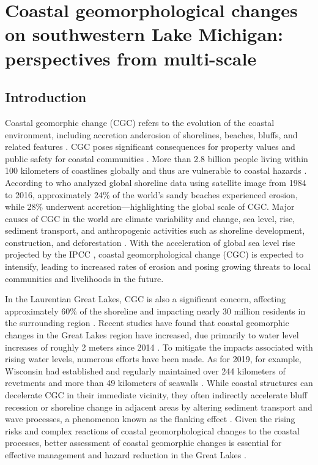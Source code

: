 \chapter{Coastal geomorphological changes on southwestern Lake Michigan: perspectives from multi-scale} 
\label{Chapter2}
\section{Introduction} 
\label{Introduction} 
Coastal geomorphic change (CGC) refers to the evolution of the coastal
environment, including accretion anderosion of shorelines, beaches, bluffs, and
related features \citep{vitousek2024scalable}. CGC poses significant consequences for
property values and public safety for coastal communities \citep{allen2019linking}.
More than 2.8 billion people living within 100 kilometers of coastlines globally
and thus are vulnerable to coastal hazards \citep{martinez2007coasts,
cosby_accelerating_2024}.  According to \citet{luijendijk_state_2018} who
analyzed global shoreline data using satellite image from 1984 to 2016,
approximately 24\% of the world’s sandy beaches experienced erosion, while 28\%
underwent accretion—highlighting the global scale of CGC. Major causes of CGC in
the world are climate variability and change, sea level, rise, sediment
transport, and anthropogenic activities such as shoreline development,
construction, and deforestation \citep{mangor2004shoreline}.  With the acceleration of
global sea level rise projected by the IPCC \citep{siegert2020twenty}, coastal
geomorphological change (CGC) is expected to intensify, leading to increased
rates of erosion and posing growing threats to local communities and livelihoods
in the future.  

In the Laurentian Great Lakes, CGC is also a significant concern, affecting
approximately 60\% of the shoreline and impacting nearly 30 million residents in
the surrounding region
\citep{mickelson1977shoreline,mickelson2004erosion,brown_factors_2005,jackson_coastal_2013}.
Recent studies have found that coastal geomorphic changes in the Great Lakes
region have increased, due primarily to water level increases of roughly 2
meters since 2014 \citep{gronewold_hydrological_2016,gronewold_tug--war_2021}.
To mitigate the impacts associated with rising water levels, numerous efforts
have been made. As for 2019, for example, Wisconsin had established and
regularly maintained over 244 kilometers of revetments and more than 49
kilometers of seawalls \citep{mickelson2007wisconsin}. While coastal structures
can decelerate CGC in their immediate vicinity, they often indirectly accelerate
bluff recession or shoreline change in adjacent areas by altering sediment
transport and wave processes, a phenomenon known as the flanking effect
\citep{brown2012human,lin_field_2014}. Given the rising risks and complex
reactions of coastal geomorphological changes to the coastal processes, better
assessment of coastal geomorphic changes is essential for effective management
and hazard reduction in the Great Lakes \citep{lawrence1994natural}.

